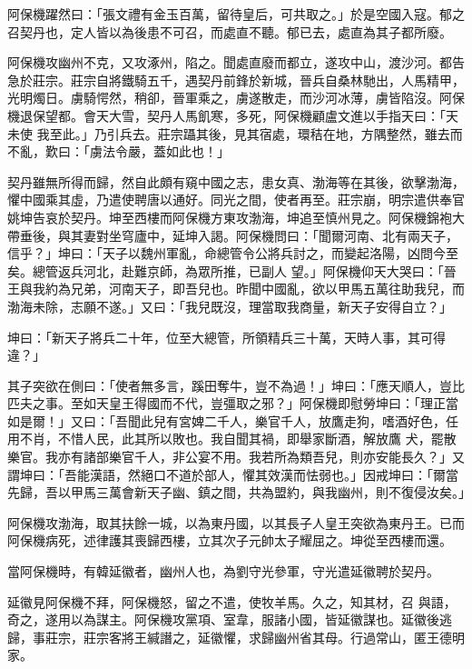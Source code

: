 \begin{pinyinscope}
 阿保機躍然曰：「張文禮有金玉百萬，留待皇后，可共取之。」於是空國入寇。郁之召契丹也，定人皆以為後患不可召，而處直不聽。郁已去，處直為其子都所廢。



 阿保機攻幽州不克，又攻涿州，陷之。聞處直廢而都立，遂攻中山，渡沙河。都告急於莊宗。莊宗自將鐵騎五千，遇契丹前鋒於新城，晉兵自桑林馳出，人馬精甲，光明燭日。虜騎愕然，稍卻，晉軍乘之，虜遂散走，而沙河冰薄，虜皆陷沒。阿保機退保望都。會天大雪，契丹人馬飢寒，多死，阿保機顧盧文進以手指天曰：「天未使
 我至此。」乃引兵去。莊宗躡其後，見其宿處，環秸在地，方隅整然，雖去而不亂，歎曰：「虜法令嚴，蓋如此也！」



 契丹雖無所得而歸，然自此頗有窺中國之志，患女真、渤海等在其後，欲擊渤海，懼中國乘其虛，乃遣使聘唐以通好。同光之間，使者再至。莊宗崩，明宗遣供奉官姚坤告哀於契丹。坤至西樓而阿保機方東攻渤海，坤追至慎州見之。阿保機錦袍大帶垂後，與其妻對坐穹廬中，延坤入謁。阿保機問曰：「聞爾河南、北有兩天子，信乎？」坤曰：「天子以魏州軍亂，命總管令公將兵討之，而變起洛陽，凶問今至矣。總管返兵河北，赴難京師，為眾所推，已副人
 望。」阿保機仰天大哭曰：「晉王與我約為兄弟，河南天子，即吾兒也。昨聞中國亂，欲以甲馬五萬往助我兒，而渤海未除，志願不遂。」又曰：「我兒既沒，理當取我商量，新天子安得自立？」



 坤曰：「新天子將兵二十年，位至大總管，所領精兵三十萬，天時人事，其可得違？」



 其子突欲在側曰：「使者無多言，蹊田奪牛，豈不為過！」坤曰：「應天順人，豈比匹夫之事。至如天皇王得國而不代，豈彊取之邪？」阿保機即慰勞坤曰：「理正當如是爾！」又曰：「吾聞此兒有宮婢二千人，樂官千人，放鷹走狗，嗜酒好色，任用不肖，不惜人民，此其所以敗也。我自聞其禍，即舉家斷酒，解放鷹
 犬，罷散樂官。我亦有諸部樂官千人，非公宴不用。我若所為類吾兒，則亦安能長久？」又謂坤曰：「吾能漢語，然絕口不道於部人，懼其效漢而怯弱也。」因戒坤曰：「爾當先歸，吾以甲馬三萬會新天子幽、鎮之間，共為盟約，與我幽州，則不復侵汝矣。」



 阿保機攻渤海，取其扶餘一城，以為東丹國，以其長子人皇王突欲為東丹王。已而阿保機病死，述律護其喪歸西樓，立其次子元帥太子耀屈之。坤從至西樓而還。



 當阿保機時，有韓延徽者，幽州人也，為劉守光參軍，守光遣延徽聘於契丹。



 延徽見阿保機不拜，阿保機怒，留之不遣，使牧羊馬。久之，知其材，召
 與語，奇之，遂用以為謀主。阿保機攻黨項、室韋，服諸小國，皆延徽謀也。延徽後逃歸，事莊宗，莊宗客將王緘譖之，延徽懼，求歸幽州省其母。行過常山，匿王德明家。




\end{pinyinscope}
